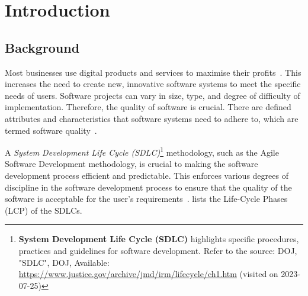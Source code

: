 \chapter{Introduction}
\label{chap:1}

\section{Background}\label{section:ch1_background}
Most businesses use digital products and services to maximise their profits~\cite{Gralha2018}. This increases the need to create new, innovative software systems to meet the specific needs of users. Software projects can vary in size, type, and degree of difficulty of implementation. Therefore, the quality of software is crucial. There are defined attributes and characteristics that software systems need to adhere to, which are termed software quality~\cite{Khan2013}. \par A \textit{System Development Life Cycle (SDLC)}\footnote{\textbf{System Development Life Cycle (SDLC)} highlights specific procedures, practices and guidelines for software development. Refer to the source: DOJ, "SDLC", DOJ, Available: \url{https://www.justice.gov/archive/jmd/irm/lifecycle/ch1.htm} (visited on 2023-07-25)} methodology, such as the Agile Software Development methodology, is crucial to making the software development process efficient and predictable. This enforces various degrees of discipline in the software development process to ensure that the quality of the software is acceptable for the user's requirements~\cite{Khan2013, Al-Saiyd2015}.  lists the Life-Cycle Phases (LCP) of the SDLCs.

